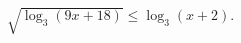 \begin{ex}[type=inequality]
	\begin{condition}
		$ \sqrt{\log_3(9x + 18)}\leqslant\log_3(x + 2) .$
	\end{condition}
\end{ex}